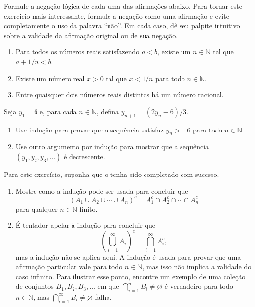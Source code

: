 \begin{exercise}\label{ex:negacao-logica}
Formule a negação lógica de cada uma das afirmações abaixo. 
Para tornar este exercicio mais interessante, 
formule a negação como uma afirmação e evite completamente o uso da palavra ``não''. 
Em cada caso, dê seu palpite intuitivo sobre a validade da afirmação original ou de sua negação.
\begin{enumerate}[label=\alph*)]
\item Para todos os números reais satisfazendo $a < b$, existe um $n \in \mathbb{N}$ tal que $a + 1/n < b$.
\item Existe um número real $x > 0$ tal que $x < 1/n$ para todo $n \in \mathbb{N}$.
\item Entre quaisquer dois números reais distintos há um número racional.
\end{enumerate}
\end{exercise}

\begin{exercise}\label{ex:inducao-sequencia-y}
Seja $y_{1} = 6$ e, para cada $n \in \mathbb{N}$, defina $y_{n+1} = (2 y_{n} - 6)/3$.
\begin{enumerate}[label=\alph*)]
\item Use indução para provar que a sequência satisfaz $y_{n} > -6$ para todo $n \in \mathbb{N}$.
\item Use outro argumento por indução para mostrar que a sequência $(y_{1}, y_{2}, y_{3}, \ldots)$ é decrescente.
\end{enumerate}
\end{exercise}

\begin{exercise}\label{ex:de-morgan-inducao}
Para este exercício, suponha que o  tenha sido completado com sucesso.
\begin{enumerate}[label=\alph*)]
\item Mostre como a indução pode ser usada para concluir que
\[
(A_{1} \cup A_{2} \cup \cdots \cup A_{n})^{c} = A_{1}^{c} \cap A_{2}^{c} \cap \cdots \cap A_{n}^{c}
\]
para qualquer $n \in \mathbb{N}$ finito.
\item É tentador apelar à indução para concluir que
\[
\left( \bigcup_{i=1}^{\infty} A_{i} \right)^{c} = \bigcap_{i=1}^{\infty} A_{i}^{c},
\]
mas a indução não se aplica aqui. A indução é usada para provar que uma afirmação particular vale para todo $n \in \mathbb{N}$, mas isso não implica a validade do caso infinito. Para ilustrar esse ponto, encontre um exemplo de uma coleção de conjuntos $B_{1}, B_{2}, B_{3}, \ldots$ em que $\bigcap_{i=1}^{n} B_{i} \neq \varnothing$ é verdadeiro para todo $n \in \mathbb{N}$, mas $\bigcap_{i=1}^{\infty} B_{i} \neq \varnothing$ falha.
\end{enumerate}
\end{exercise}

